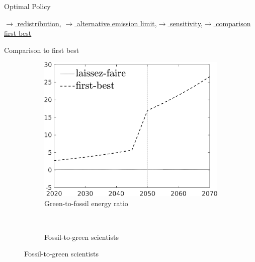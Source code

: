 \documentclass[11pt,aspectratio=169]{beamer}
\begin{document}
\begin{frame}{Optimal Policy}
\hypertarget{backOPT}{}
\vspace{-4mm}
\hfill

\hyperlink{Redis}{\tiny{$\rightarrow$ redistribution,}}
\hyperlink{altems}{\tiny{$\rightarrow$ alternative emission limit,}}\hyperlink{sensphi}{\tiny{$\rightarrow$ sensitivity,}}\hyperlink{compfb}{\tiny{$\rightarrow$ comparison first best}}
\end{frame}



\begin{frame}{Comparison to first best}
	\hypertarget{compfb}{}
	\vspace{-3mm}
	\pause
	\centering
	\begin{figure}
		\begin{subfigure}{0.45\textwidth}
			\caption{\normalsize{Green-to-fossil energy ratio} }
			\includegraphics[width=1\textwidth]{../codding_model/own_basedOnFried/optimalPol_010922_revision/figures/all_13Sept22_Tplus30/GFF_slides_CompEffLF_regime4_knspil0_spillover0_noskill0_sep0_xgrowth0_countec0_PV1_etaa0.79_lgd1.png}
		\end{subfigure}
		\begin{minipage}[]{0.05\textwidth}
			\
		\end{minipage}
		\begin{subfigure}{0.45\textwidth}
			\caption{\normalsize{Fossil-to-green scientists }}

\end{subfigure}
\end{figure}
\end{frame}
\end{document}
